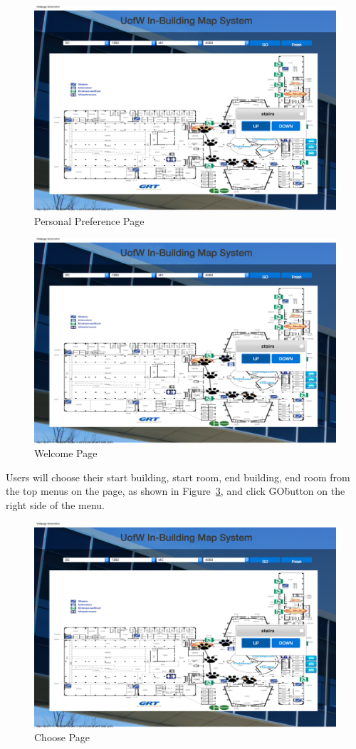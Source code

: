 \documentclass{sigchi}
\begin{document}
\begin{figure}[!h]
\centering
\includegraphics[width=0.6\columnwidth]{pics/personal_page.png}
\caption{Personal Preference Page}
\label{fig:personal_page}
\end{figure}

\begin{figure}[!h]
\centering
\includegraphics[width=0.6\columnwidth]{pics/routedraw_page.png}
\caption{Welcome Page}
\label{fig:routedraw_page}
\end{figure}

Users will choose their start building, start room, end building, end room from the top menus on the page, as shown in Figure~\ref{fig:choose_page}, and click \"GO\" button on the right side of the menu.


\begin{figure}[!h]
\centering
\includegraphics[width=0.6\columnwidth]{pics/choose_page.png}
\caption{Choose Page}
\label{fig:choose_page}
\end{figure}
\end{document}
